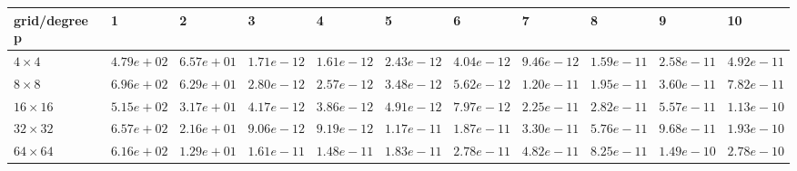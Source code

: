 \begin{tabular}{lllllllllll}
\hline
 grid/degree p   & 1          & 2          & 3          & 4          & 5          & 6          & 7          & 8          & 9          & 10         \\
\hline
 $4 \times 4$    & $4.79e+02$ & $6.57e+01$ & $1.71e-12$ & $1.61e-12$ & $2.43e-12$ & $4.04e-12$ & $9.46e-12$ & $1.59e-11$ & $2.58e-11$ & $4.92e-11$ \\
 $8 \times 8$    & $6.96e+02$ & $6.29e+01$ & $2.80e-12$ & $2.57e-12$ & $3.48e-12$ & $5.62e-12$ & $1.20e-11$ & $1.95e-11$ & $3.60e-11$ & $7.82e-11$ \\
 $16 \times 16$  & $5.15e+02$ & $3.17e+01$ & $4.17e-12$ & $3.86e-12$ & $4.91e-12$ & $7.97e-12$ & $2.25e-11$ & $2.82e-11$ & $5.57e-11$ & $1.13e-10$ \\
 $32 \times 32$  & $6.57e+02$ & $2.16e+01$ & $9.06e-12$ & $9.19e-12$ & $1.17e-11$ & $1.87e-11$ & $3.30e-11$ & $5.76e-11$ & $9.68e-11$ & $1.93e-10$ \\
 $64 \times 64$  & $6.16e+02$ & $1.29e+01$ & $1.61e-11$ & $1.48e-11$ & $1.83e-11$ & $2.78e-11$ & $4.82e-11$ & $8.25e-11$ & $1.49e-10$ & $2.78e-10$ \\
\hline
\end{tabular}